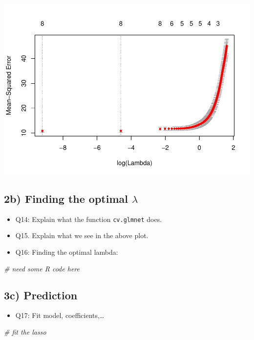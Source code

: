 \documentclass[]{article}
\newenvironment{Shaded}{\begin{snugshade}}{\end{snugshade}}
\newcommand{\CommentTok}[1]{\textcolor[rgb]{0.56,0.35,0.01}{\textit{#1}}}
\providecommand{\tightlist}{%
  \setlength{\itemsep}{0pt}\setlength{\parskip}{0pt}}
\begin{document}
\includegraphics{1_files/figure-latex/unnamed-chunk-5-1.pdf}

\subsection{\texorpdfstring{2b) Finding the optimal
\(\lambda\)}{2b) Finding the optimal \textbackslash{}lambda}}\label{b-finding-the-optimal-lambda}

\begin{itemize}
\tightlist
\item
  Q14: Explain what the function \texttt{cv.glmnet} does.
\item
  Q15. Explain what we see in the above plot.
\item
  Q16: Finding the optimal lambda:
\end{itemize}

\begin{Shaded}
\begin{Highlighting}[]
\CommentTok{# need some R code here}
\end{Highlighting}
\end{Shaded}

\subsection{3c) Prediction}\label{c-prediction}

\begin{itemize}
\tightlist
\item
  Q17: Fit model, coefficients,\ldots{}
\end{itemize}

\begin{Shaded}
\begin{Highlighting}[]
\CommentTok{# fit the lasso}
\end{Highlighting}
\end{Shaded}
\end{document}
